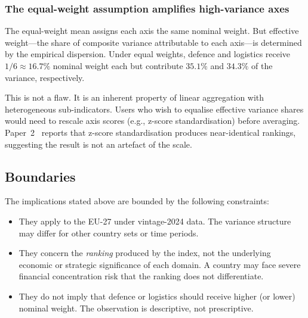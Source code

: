 \subsubsection{The equal-weight assumption amplifies
  high-variance axes}

The equal-weight mean assigns each axis the same nominal weight.  But
effective weight---the share of composite variance attributable to
each axis---is determined by the empirical dispersion.  Under equal
weights, defence and logistics receive $1/6 \approx 16.7\%$
nominal weight each but contribute $35.1\%$ and $34.3\%$ of the
variance, respectively.

This is not a flaw.  It is an inherent property of linear
aggregation with heterogeneous sub-indicators.  Users who wish to
equalise effective variance shares would need to rescale axis scores
(e.g., z-score standardisation) before averaging.
Paper~2~\cite{isi_paper2} reports that z-score standardisation
produces near-identical rankings, suggesting the result is not an
artefact of the scale.

\subsection{Boundaries}

The implications stated above are bounded by the following constraints:

\begin{itemize}[leftmargin=2em]
  \item They apply to the EU-27 under vintage-2024 data.  The
    variance structure may differ for other country sets or time
    periods.
  \item They concern the \emph{ranking} produced by the index, not
    the underlying economic or strategic significance of each
    domain.  A country may face severe financial concentration risk
    that the ranking does not differentiate.
  \item They do not imply that defence or logistics should receive
    higher (or lower) nominal weight.  The observation is
    descriptive, not prescriptive.
\end{itemize}
